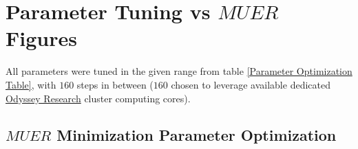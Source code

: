 	\fi



\section{Parameter Tuning vs $MUER$ Figures}

All parameters were tuned in the given range from table \ref{Parameter Optimization Table}, with $160$ steps in between ($160$ chosen to leverage available dedicated \href{https://www.rc.fas.harvard.edu/}{Odyssey Research} cluster computing cores).


\subsection{$MUER$ Minimization Parameter Optimization}
\label{MUER Minimization Parameter Optimization}


